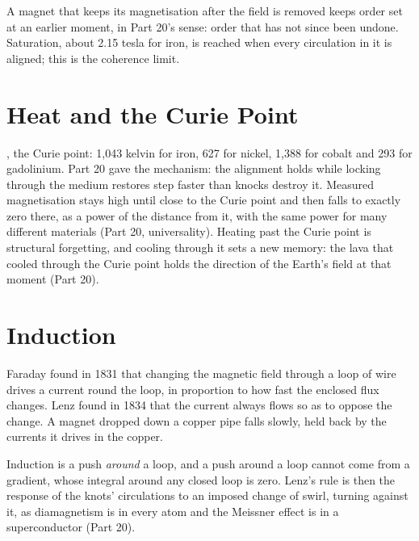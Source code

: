 \documentclass[11pt,a4paper]{article}
\begin{document}
 A magnet that keeps its magnetisation after the field is removed keeps order set at an earlier moment, in Part 20's sense: order that has not since been undone. Saturation, about 2.15 tesla for iron, is reached when every circulation in it is aligned; this is the coherence limit.

\section{Heat and the Curie Point}
\label{sec:curie}

, the Curie point: 1,043 kelvin for iron, 627 for nickel, 1,388 for cobalt and 293 for gadolinium. Part 20 gave the mechanism: the alignment holds while locking through the medium restores step faster than knocks destroy it. Measured magnetisation stays high until close to the Curie point and then falls to exactly zero there, as a power of the distance from it, with the same power for many different materials (Part 20, universality). Heating past the Curie point is structural forgetting, and cooling through it sets a new memory: the lava that cooled through the Curie point holds the direction of the Earth's field at that moment (Part 20).

\section{Induction}
\label{sec:induction}

 Faraday found in 1831 that changing the magnetic field through a loop of wire drives a current round the loop, in proportion to how fast the enclosed flux changes. Lenz found in 1834 that the current always flows so as to oppose the change. A magnet dropped down a copper pipe falls slowly, held back by the currents it drives in the copper.

Induction is a push \emph{around} a loop, and a push around a loop cannot come from a gradient, whose integral around any closed loop is zero.  Lenz's rule is then the response of the knots' circulations to an imposed change of swirl, turning against it, as diamagnetism is in every atom and the Meissner effect is in a superconductor (Part 20).
\end{document}
